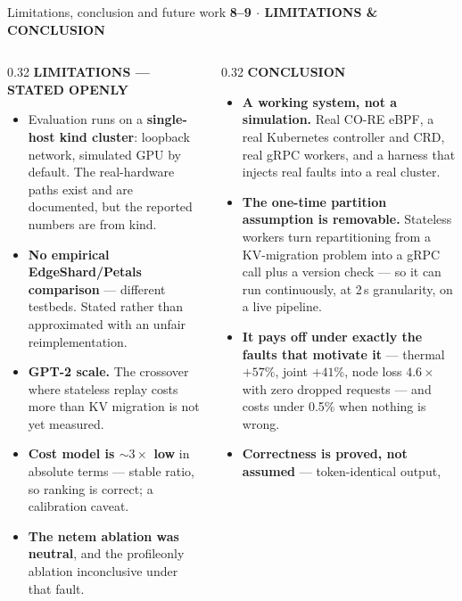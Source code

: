 \documentclass[aspectratio=169,9pt]{beamer}
\newcommand{\kicker}[1]{{\scriptsize\color{keBlue}\bfseries\MakeUppercase{#1}}\par\vspace{0.2em}}
\newcommand{\hl}[1]{\textbf{\color{keNavy}#1}}
\newcommand{\good}[1]{{\color{keGreen}#1}}
\begin{document}
\begin{frame}[shrink=25]{Limitations, conclusion and future work}
  \kicker{8--9 $\cdot$ Limitations \& Conclusion}
  \begin{columns}[T]
    \begin{column}{0.32\textwidth}
      \kicker{Limitations --- stated openly}
      \scriptsize
      \begin{itemize}\setlength\itemsep{0.35em}
        \item Evaluation runs on a \hl{single-host kind cluster}: loopback
          network, simulated GPU by default. The real-hardware paths exist and
          are documented, but the reported numbers are from kind.
        \item \hl{No empirical EdgeShard/Petals comparison} --- different
          testbeds. Stated rather than approximated with an unfair
          reimplementation.
        \item \hl{GPT-2 scale.} The crossover where stateless replay costs more
          than KV migration is not yet measured.
        \item \hl{Cost model is ${\sim}3\times$ low} in absolute terms --- stable
          ratio, so ranking is correct; a calibration caveat.
        \item \hl{The netem ablation was neutral}, and the profileonly ablation
          inconclusive under that fault.
      \end{itemize}
    \end{column}
    \begin{column}{0.32\textwidth}
      \kicker{Conclusion}
      \scriptsize
      \begin{itemize}\setlength\itemsep{0.35em}
        \item \hl{A working system, not a simulation.} Real CO-RE eBPF, a real
          Kubernetes controller and CRD, real gRPC workers, and a harness that
          injects real faults into a real cluster.
        \item \hl{The one-time partition assumption is removable.} Stateless
          workers turn repartitioning from a KV-migration problem into a gRPC
          call plus a version check --- so it can run continuously, at 2\,s
          granularity, on a live pipeline.
        \item \good{\hl{It pays off under exactly the faults that motivate it}}
          --- thermal $+57\%$, joint $+41\%$, node loss $4.6\times$ with zero
          dropped requests --- and costs under 0.5\% when nothing is wrong.
        \item \hl{Correctness is proved, not assumed} --- token-identical output,

\end{itemize}
\end{column}
\end{columns}
\end{frame}
\end{document}
